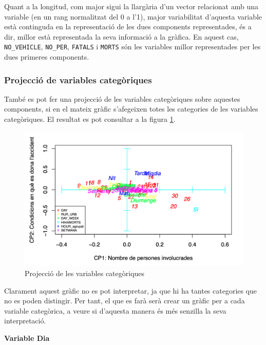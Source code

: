 \documentclass[12pt,longbibliography]{article}
\theoremstyle{definition}
\theoremstyle{remark}
\begin{document}
Quant a la longitud, com major sigui la llargària d'un vector relacionat amb una variable (en un rang normalitzat del 0 a l'1), major variabilitat d'aquesta variable està continguda en la representació de les dues components representades, és a dir, millor està representada la seva informació a la gràfica. En aquest cas, \texttt{NO\_VEHICLE}, \texttt{NO\_PER}, \texttt{FATALS} i \texttt{MORTS} són les variables millor representades per les dues primeres components.


\subsubsection{Projecció de variables categòriques}


També es pot fer una projecció de les variables categòriques sobre aquestes components, si en el mateix gràfic s'afegeixen totes les categories de les variables categòriques. El resultat es pot consultar a la figura \ref{fig:ACP6}.

\begin{figure}[H]
\begin{center}
\includegraphics[width=12cm]{acp6}
\end{center}
\caption{Projecció de les variables categòriques}
\label{fig:ACP6}
\end{figure}


Clarament aquest gràfic no es pot interpretar, ja que hi ha tantes categories que no es poden distingir.
Per tant, el que es farà serà crear un gràfic per a cada variable categòrica, a veure si d'aquesta manera és més senzilla la seva interpretació.



\textbf{Variable Dia}
\end{document}
